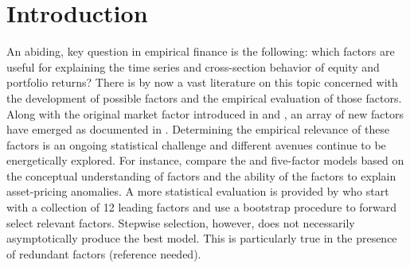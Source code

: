 \documentclass[12pt]{article}
\begin{document}
\section{Introduction}
  An abiding, key question in empirical finance is the following: which factors are useful for explaining the time series and cross-section behavior of equity and portfolio returns? There is by now a vast literature on this topic concerned with the development of possible factors and the empirical evaluation of those factors. Along with the original market factor introduced in \cite{sharpe1964capital} and \cite{lintner1965valuation}, an array of new factors have emerged as documented in \cite{harvey2015and}. Determining the empirical relevance of these factors is an ongoing statistical challenge and different avenues continue to be energetically explored. For instance, \cite{hou2014comparison} compare the \cite{hou2014digesting} and   \cite{fama2015five} five-factor models based on the conceptual understanding of factors and the ability of the factors to explain asset-pricing anomalies.  A more statistical evaluation is provided by \cite{harvey2015lucky} who start with a collection of 12 leading factors and use a bootstrap procedure to forward select relevant factors. Stepwise selection, however, does not necessarily asymptotically produce the best model. This is particularly true in the presence of redundant factors (reference needed). \\
\end{document}
